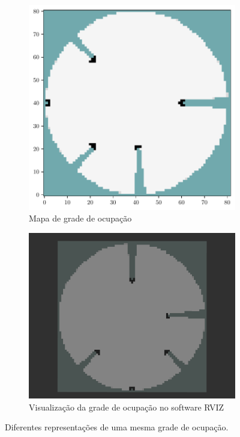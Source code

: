 \begin{figure}
  \centering
  \begin{subfigure}{0.45\textwidth}
    \includegraphics[width=\textwidth]{figs/grid_map_view_big.pdf} 
    \caption{Mapa de grade de ocupação}
    \label{fig:grid-map-big-rep}
  \end{subfigure}
  \hfill
  \begin{subfigure}{0.49\textwidth}
    \centering
    \includegraphics[width=\textwidth, angle=-90]{figs/grid-map.png} 
    \caption{Visualização da grade de ocupação no software RVIZ}
    \label{fig:}
  \end{subfigure}
  \caption[Representações de uma grade de ocupação]{Diferentes representações de uma mesma grade de ocupação.}
  \label{fig:occupancy-grid-visualization-comparsion}
\end{figure}

